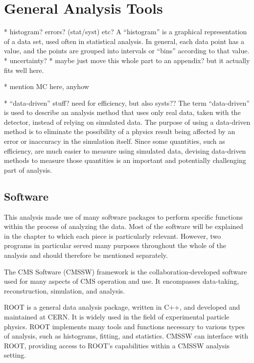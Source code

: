 \section{General Analysis Tools} %

   * histogram?  errors? (stat/syst) etc?
A ``histogram'' is a graphical representation 
of a data set, used often in statistical analysis.  
In general, each data point has a value, 
and the points are grouped into intervals or ``bins'' 
according to that value.  
   * uncertainty?
   * maybe just move this whole part to an appendix?  
but it actually fits well here. 

   * mention MC here, anyhow

   * ``data-driven'' stuff?  need for efficiency, but also systs??
The term ``data-driven'' is used to describe an analysis method 
that uses only real data, taken with the detector, 
instead of relying on simulated data.  
The purpose of using a data-driven method is to 
eliminate the possibility of a physics result 
being affected by an error or inaccuracy 
in the simulation itself.  
Since some quantities, such as efficiency, 
are much easier to measure using simulated data, 
devising data-driven methods to measure those quantities 
is an important and potentially challenging 
part of analysis.  

\subsection{Software}



This analysis made use of many software packages 
to perform specific functions within 
the process of analyzing the data.  
Most of the software will be explained 
in the chapter to which each piece is particularly 
relevant.  
However, two programs in particular 
served many purposes 
throughout the whole of the analysis and 
should therefore be mentioned separately.  

The CMS Software (CMSSW) framework is 
the collaboration-developed software 
used for many aspects of CMS operation and use.  
It encompasses data-taking, reconstruction, 
simulation, and analysis.  

ROOT is a general data analysis package, 
written in C++, 
and developed and maintained at CERN. 
It is widely used in the field of 
experimental particle physics.  
ROOT implements many tools and functions 
necessary to various types of analysis, 
such as histograms, fitting, 
and statistics.  
CMSSW can interface with ROOT, 
providing access to ROOT's %
capabilities within a CMSSW 
analysis setting.  

